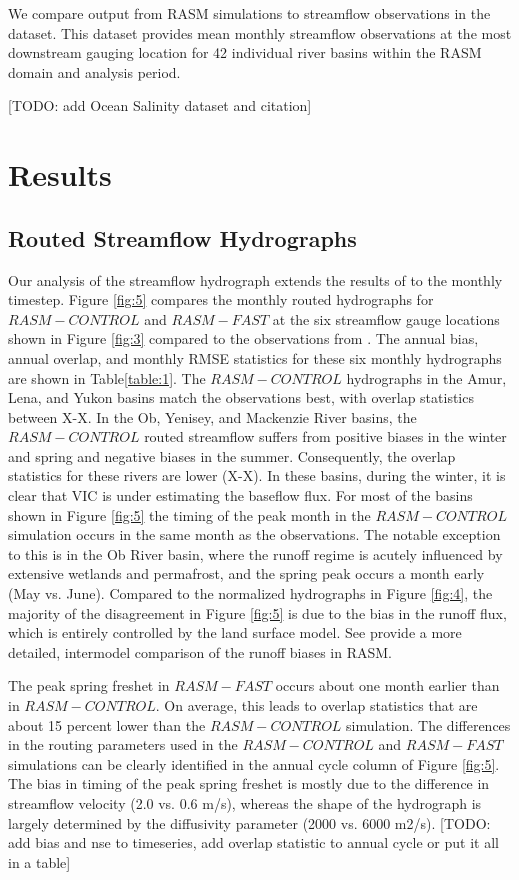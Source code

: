 \documentclass[jgrga, draft]{agutex}
\begin{document}
\begin{article}
We compare output from RASM simulations to streamflow observations in the \citet{Dai_2009} dataset.
This dataset provides mean monthly streamflow observations at the most downstream gauging location for 42 individual river basins within the RASM domain and analysis period.

[TODO: add Ocean Salinity dataset and citation]

\section{Results}

\subsection{Routed Streamflow Hydrographs}

Our analysis of the streamflow hydrograph extends the results of \citet{Hamman_2015} to the monthly timestep.
Figure \ref{fig:5} compares the monthly routed hydrographs for $RASM-CONTROL$ and $RASM-FAST$ at the six streamflow gauge locations shown in Figure \ref{fig:3} compared to the observations from \citep{Dai_2009}.
The annual bias, annual overlap, and monthly RMSE statistics for these six monthly hydrographs are shown in Table\ref{table:1}.
The $RASM-CONTROL$ hydrographs in the Amur, Lena, and Yukon basins match the observations best, with overlap statistics between X-X.
In the Ob, Yenisey, and Mackenzie River basins, the $RASM-CONTROL$ routed streamflow suffers from positive biases in the winter and spring and negative biases in the summer.
Consequently, the overlap statistics for these rivers are lower (X-X).
In these basins, during the winter, it is clear that VIC is under estimating the baseflow flux.
For most of the basins shown in Figure \ref{fig:5} the timing of the peak month in the $RASM-CONTROL$ simulation occurs in the same month as the observations.
The notable exception to this is in the Ob River basin, where the runoff regime is acutely influenced by extensive wetlands and permafrost, and the spring peak occurs a month early (May vs. June).
Compared to the normalized hydrographs in Figure \ref{fig:4}, the majority of the disagreement in Figure \ref{fig:5} is due to the bias in the runoff flux, which is entirely controlled by the land surface model.
See \citep{Hamman_2015} provide a more detailed, intermodel comparison of the runoff biases in RASM.

The peak spring freshet in $RASM-FAST$ occurs about one month earlier than in $RASM-CONTROL$.
On average, this leads to overlap statistics that are about 15 percent lower than the $RASM-CONTROL$ simulation.
The differences in the routing parameters used in the $RASM-CONTROL$ and $RASM-FAST$ simulations can be clearly identified in the annual cycle column of Figure \ref{fig:5}.
The bias in timing of the peak spring freshet is mostly due to the difference in streamflow velocity (2.0 vs. 0.6 m/s), whereas the shape of the hydrograph is largely determined by the diffusivity parameter (2000 vs. 6000 m2/s).
[TODO: add bias and nse to timeseries, add overlap statistic to annual cycle or put it all in a table]


\end{article}
\end{document}
